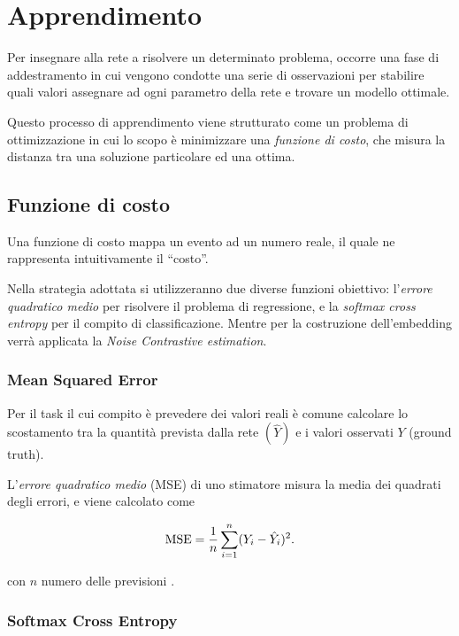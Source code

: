 \section{Apprendimento}
\label{sec:apprendimento}
Per insegnare alla rete a risolvere un determinato problema, occorre una fase di addestramento in cui vengono condotte una serie di osservazioni per stabilire quali valori assegnare ad ogni parametro della rete e trovare un modello ottimale.

Questo processo di apprendimento viene strutturato come un problema di ottimizzazione in cui lo scopo è minimizzare una \emph{funzione di costo}, che misura la distanza tra una soluzione particolare ed una ottima. 

\subsection{Funzione di costo}
\label{subsec:loss}

Una funzione di costo mappa un evento ad un numero reale, il quale ne rappresenta intuitivamente il ``costo''.

Nella strategia adottata si utilizzeranno due diverse funzioni obiettivo: l'\emph{errore quadratico medio} per risolvere il problema di regressione, e la \emph{softmax cross entropy} per il compito di classificazione. Mentre per la costruzione dell'embedding verrà applicata la \emph{Noise Contrastive estimation}.

\subsubsection{Mean Squared Error}
\label{subsubsec:MSE}

Per il task il cui compito è prevedere dei valori reali è comune calcolare lo scostamento tra la quantità prevista dalla rete $(\hat{Y})$ e i valori osservati $Y$ (ground truth). 
 
L'\emph{errore quadratico medio} (MSE) di uno stimatore misura la media dei quadrati degli errori, e viene calcolato come

\begin{equation}
\operatorname{MSE} = \frac{1}{n}\sum_{i=1}^{n}(Y_i-\hat{Y}_i)^2 \mbox{.}
\end{equation}

con $n$ numero delle previsioni \cite{wang2009mean}.

\subsubsection{Softmax Cross Entropy}
\label{subsubsec:sce}

